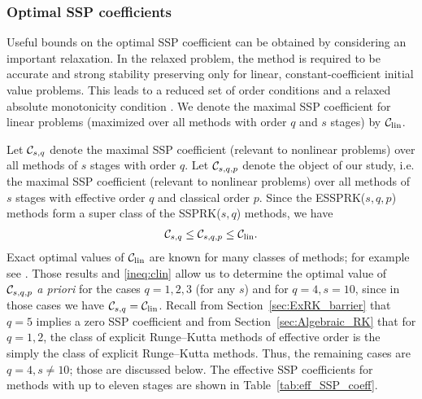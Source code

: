 \subsubsection{Optimal SSP coefficients}\label{subsubsec:optimal_SSP_coeff}
Useful bounds on the optimal SSP coefficient can be obtained 
by considering an important relaxation. 
In the relaxed problem, the method is required to be accurate and strong 
stability preserving only for linear, constant-coefficient initial value problems. 
This leads to a reduced set of order conditions and a relaxed absolute 
monotonicity condition \cite{Kraaijevanger1986,Ketcheson2008,ketcheson2009a}.
We denote the maximal SSP coefficient for linear problems
(maximized over all methods with order $q$ and $s$ stages) by $\mathcal{C}_{\text{lin}}$.

Let $\mathcal{C}_{s,q}$ denote the maximal SSP coefficient (relevant to
nonlinear problems) over all methods of $s$ stages with order $q$.  Let
$\mathcal{C}_{s,q,p}$ denote the object of our study, i.e. the maximal SSP
coefficient (relevant to nonlinear problems) over all methods of $s$ stages
with effective order $q$ and classical order $p$.
Since the ESSPRK($s,q,p$) methods form a super class of the SSPRK($s,q$)
methods, we have
\begin{align} \label{ineq:clin}
        \mathcal{C}_{s,q} \le \mathcal{C}_{s,q,p} \le\mathcal{C}_{\text{lin}}.
\end{align}
Exact optimal values of $\mathcal{C}_{\text{lin}}$ are known for many classes of methods; for
example see \cite{Kraaijevanger1986,Ketcheson2008,ketcheson2009a}.
Those results and \eqref{ineq:clin} allow us to determine the optimal value
of $\mathcal{C}_{s,q,p}$ {\em a priori} for the cases $q=1,2,3$ (for any $s$) and
for $q=4,s=10$, since in those cases we have $\mathcal{C}_{s,q}=\mathcal{C}_{\text{lin}}$.
Recall from Section~\ref{sec:ExRK_barrier} that $q=5$ implies a zero
SSP coefficient and from Section~\ref{sec:Algebraic_RK} that for
$q=1,2$, the class of explicit Runge--Kutta methods of effective order
is the simply the class of explicit Runge--Kutta methods.  %
Thus, the remaining cases are $q=4, s\ne 10$; those are discussed below.
The effective SSP coefficients for methods with up to eleven stages are shown in 
Table~\ref{tab:eff_SSP_coeff}.

